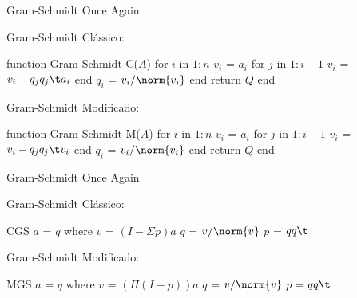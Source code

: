 
\begin{frame}[fragile]{Gram-Schmidt Once Again}
  \begin{minipage}[t]{0.45\textwidth}
    Gram-Schmidt Clássico:
    \vspace{0.2cm}
    \begin{code}
function Gram-Schmidt-C($A$)
    for $i$ in $1:n$
        $v_i$ = $a_i$
        for $j$ in $1:i-1$
            $v_i$ = $v_i - q_j q_j\t a_i$
        end
        $q_i$ = $v_i / \norm{v_i}$
    end
    return $Q$
end
    \end{code}
  \end{minipage}
  \pause
  \hfill
  \vrule
  \hfill
  \begin{minipage}[t]{0.50\textwidth}
    Gram-Schmidt Modificado:
    \vspace{0.2cm}
    \begin{code}
function Gram-Schmidt-M($A$)
    for $i$ in $1:n$
        $v_i$ = $a_i$
        for $j$ in $1:i-1$
            $v_i$ = $v_i - q_j q_j\t v_i$
        end
        $q_i$ = $v_i / \norm{v_i}$
    end
    return $Q$
end
    \end{code}
  \end{minipage}
  \vfill
\end{frame}

\begin{frame}[fragile]{Gram-Schmidt Once Again}
  \begin{minipage}[t]{0.45\textwidth}
    Gram-Schmidt Clássico:
    \vspace{0.2cm}
    \begin{code}
CGS $a$ = $q$
    where
        $v$ = $(I - \Sigma p) a$
        $q$ = $v / \norm{v}$
        $p$ = $qq\t$
    \end{code}
  \end{minipage}
  \pause
  \hfill
  \vrule
  \hfill
  \begin{minipage}[t]{0.50\textwidth}
    Gram-Schmidt Modificado:
    \vspace{0.2cm}
    \begin{code}
MGS $a$ = $q$
    where
        $v$ = $(\Pi (I - p)) a$
        $q$ = $v / \norm{v}$
        $p$ = $qq\t$
    \end{code}
  \end{minipage}
  \vfill
\end{frame}

